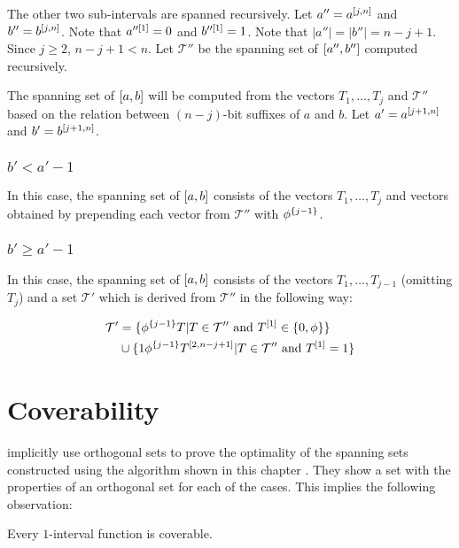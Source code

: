 The other two sub-intervals are spanned recursively.
Let $a'' = a^{[j, n]}$ and $b'' = b^{[j, n]}$.
Note that $a''^{[1]} = 0$ and $b''^{[1]} = 1$.
Note that $|a''| = |b''| = n - j + 1$.
Since $j \geq 2$, $n-j+1 < n$.
Let $\mathcal{T}''$ be the spanning set
of $[a'', b'']$ computed recursively.

The spanning set of $[a, b]$ will be computed
from the vectors $T_1, \ldots, T_j$ and $\mathcal{T}''$
based on the relation between $(n-j)$-bit suffixes of $a$
and $b$.
Let $a' = a^{[j+1, n]}$ and $b' = b^{[j+1, n]}$.

\subsubsection{\texorpdfstring
{$b' < a' - 1$}
{b' < a' - 1}
}

In this case,
the spanning set of $[a, b]$ consists
of the vectors $T_1, \ldots, T_j$ and vectors obtained
by prepending each vector from $\mathcal{T}''$ with
$\phi^{\{j-1\}}$.

\subsubsection{\texorpdfstring
{$b' \geq a' - 1$}
{b' >= a' - 1}
}

In this case,
the spanning set of $[a, b]$ consists
of the vectors $T_1, \ldots, T_{j-1}$ (omitting $T_j$)
and a set $\mathcal{T}'$ which is derived
from $\mathcal{T}''$
in the following way:

\begin{align*}
\mathcal{T}' &= \{
\phi^{\{j-1\}} T | T \in \mathcal{T}'' \text{ and }
T^{[1]} \in \{0, \phi\}
\} \\
&\cup \{
1 \phi^{\{j-1\}} T^{[2, n-j+1]} | T \in \mathcal{T}''
\text{ and } T^{[1]} = 1
\}
\end{align*}


\section{Coverability}

\citeauthor{Schieber2005154} implicitly use
orthogonal sets
to prove the optimality
of the spanning sets
constructed using the algorithm shown in this chapter
\citep[Theorem 3]{Schieber2005154}.
They show a set with the properties of an orthogonal set
for each of the cases.
This implies the following observation:
\begin{observation}
\label{observation:1intervalcoverable}
Every $1$-interval function is coverable.
\end{observation}

